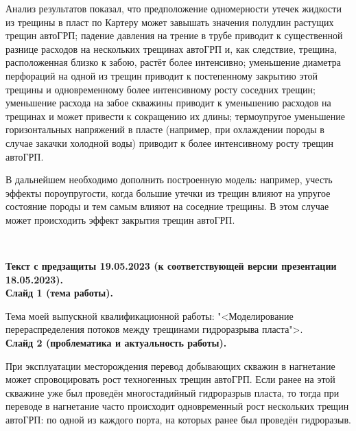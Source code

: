 \documentclass[a4paper, 12pt]{article}
\begin{document}
Анализ результатов показал, что предположение одномерности утечек жидкости из трещины в пласт по Картеру может завышать значения полудлин растущих трещин автоГРП;
падение давления на трение в трубе приводит к существенной разнице расходов на нескольких трещинах автоГРП и, как следствие, трещина, расположенная близко к забою, растёт более интенсивно;
уменьшение диаметра перфораций на одной из трещин приводит к постепенному закрытию этой трещины и одновременному более интенсивному росту соседних трещин;
уменьшение расхода на забое скважины приводит к уменьшению расходов на трещинах и может привести к сокращению их длины;
термоупругое уменьшение горизонтальных напряжений в пласте (например, при охлаждении породы в случае закачки холодной воды) приводит к более интенсивному росту трещин автоГРП.

В дальнейшем необходимо дополнить построенную модель: например, учесть эффекты пороупругости, когда большие утечки из трещин влияют на упругое состояние породы и тем самым влияют на соседние трещины.
В этом случае может происходить эффект закрытия трещин автоГРП.












\newpage
\ 
\newpage

















\textbf{\large Текст с предзащиты 19.05.2023 (к соответствующей версии презентации 18.05.2023).}\\

\textbf{Слайд 1 (тема работы).}

Тема моей выпускной квалификационной работы: "<Моделирование перераспределения потоков между трещинами гидроразрыва пласта">.\\

\textbf{Слайд 2 (проблематика и актуальность работы).}

При эксплуатации месторождения перевод добывающих скважин в нагнетание может спровоцировать рост техногенных трещин автоГРП.
Если ранее на этой скважине уже был проведён многостадийный гидроразрыв пласта, то тогда при переводе в нагнетание часто происходит одновременный рост нескольких трещин автоГРП: по одной из каждого порта, на которых ранее был проведён гидроразыв.
\end{document}
